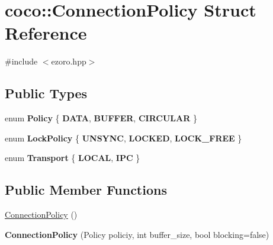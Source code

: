 \hypertarget{structcoco_1_1_connection_policy}{\section{coco\-:\-:Connection\-Policy Struct Reference}
\label{structcoco_1_1_connection_policy}
}


{\ttfamily \#include $<$ezoro.\-hpp$>$}

\subsection*{Public Types}
\begin{DoxyCompactItemize}
\item 
enum {\bfseries Policy} \{ {\bfseries D\-A\-T\-A}, 
{\bfseries B\-U\-F\-F\-E\-R}, 
{\bfseries C\-I\-R\-C\-U\-L\-A\-R}
 \}
\item 
enum {\bfseries Lock\-Policy} \{ {\bfseries U\-N\-S\-Y\-N\-C}, 
{\bfseries L\-O\-C\-K\-E\-D}, 
{\bfseries L\-O\-C\-K\-\_\-\-F\-R\-E\-E}
 \}
\item 
enum {\bfseries Transport} \{ {\bfseries L\-O\-C\-A\-L}, 
{\bfseries I\-P\-C}
 \}
\end{DoxyCompactItemize}
\subsection*{Public Member Functions}
\begin{DoxyCompactItemize}
\item 
\hyperlink{structcoco_1_1_connection_policy_a4f57d8138b054a591016a35fc4aa6bea}{Connection\-Policy} ()
\item 
\hypertarget{structcoco_1_1_connection_policy_a70af7262ac5e18bbeb38fc5b5b1459aa}{{\bfseries Connection\-Policy} (Policy policiy, int buffer\-\_\-size, bool blocking=false)}\label{structcoco_1_1_connection_policy_a70af7262ac5e18bbeb38fc5b5b1459aa}

\end{DoxyCompactItemize}
